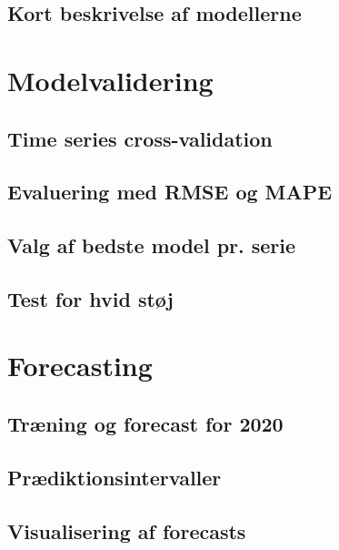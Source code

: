 \documentclass[
]{article}
\begin{document}
\subsection{Kort beskrivelse af
modellerne}\label{kort-beskrivelse-af-modellerne}

\section{Modelvalidering}\label{modelvalidering}

\subsection{Time series
cross-validation}\label{time-series-cross-validation}

\subsection{Evaluering med RMSE og
MAPE}\label{evaluering-med-rmse-og-mape}

\subsection{Valg af bedste model pr.
serie}\label{valg-af-bedste-model-pr.-serie}

\subsection{Test for hvid støj}\label{test-for-hvid-stuxf8j}

\section{Forecasting}\label{forecasting}

\subsection{Træning og forecast for
2020}\label{truxe6ning-og-forecast-for-2020}

\subsection{Prædiktionsintervaller}\label{pruxe6diktionsintervaller}

\subsection{Visualisering af
forecasts}\label{visualisering-af-forecasts}
\end{document}
